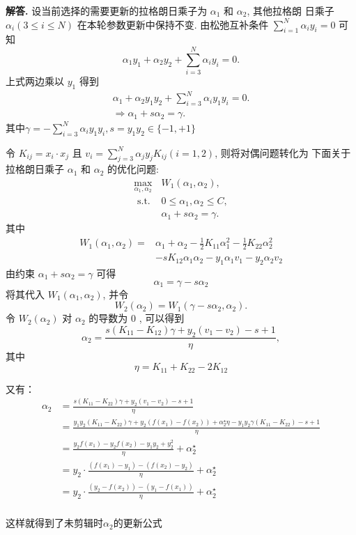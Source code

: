 \documentclass[12pt, a4paper, oneside]{ctexart}
\newenvironment{solution}{\par\noindent\textbf{解答. }}{\\\par}
\begin{document}
\begin{solution}
    设当前选择的需要更新的拉格朗日乘子为 $\alpha_1$ 和 $\alpha_2$, 其他拉格朗 日乘子 $\alpha_i(3 \leq i \leq N)$ 在本轮参数更新中保持不变. 由松弛互补条件 $\sum_{i=1}^N \alpha_i y_i=0$ 可知
$$
\alpha_1 y_1+\alpha_2 y_2+\sum_{i=3}^N \alpha_i y_i=0 .
$$
上式两边乘以 $y_1$ 得到
$$
\begin{array}{l}
\alpha_1+\alpha_2 y_1 y_2+\sum_{i=3}^N \alpha_i y_1 y_i=0 . \\
\Longrightarrow\alpha_1+s \alpha_2=\gamma .
\end{array}
$$
$\text {其中} \gamma=-\sum_{i=3}^N \alpha_i y_1 y_i, s=y_1 y_2 \in\{-1,+1\} $\par
令 $K_{i j}=x_i \cdot x_j$ 且 $v_i=\sum_{j=3}^N \alpha_j y_j K_{i j}(i=1,2)$, 则将对偶问题转化为 下面关于拉格朗日乘子 $\alpha_1$ 和 $\alpha_2$ 的优化问题:
$$
\begin{array}{cl}
\max _{\alpha_1, \alpha_2} & W_1\left(\alpha_1, \alpha_2\right), \\
\text { s.t. } & 0 \leq \alpha_1, \alpha_2 \leq C, \\
& \alpha_1+s \alpha_2=\gamma .
\end{array}
$$
其中
$$
\begin{aligned}
W_1\left(\alpha_1, \alpha_2\right)= & \alpha_1+\alpha_2-\frac{1}{2} K_{11} \alpha_1^2-\frac{1}{2} K_{22} \alpha_2^2 \\
& -s K_{12} \alpha_1 \alpha_2-y_1 \alpha_1 v_1-y_2 \alpha_2 v_2
\end{aligned}
$$
由约束 $\alpha_1+s \alpha_2=\gamma$ 可得
$$
\alpha_1=\gamma-s \alpha_2
$$
将其代入 $W_1\left(\alpha_1, \alpha_2\right)$, 并令
$$
W_2\left(\alpha_2\right)=W_1\left(\gamma-s \alpha_2, \alpha_2\right) .
$$
令 $W_2\left(\alpha_2\right)$ 对 $\alpha_2$ 的导数为 0 , 可以得到
$$
\alpha_2=\frac{s\left(K_{11}-K_{12}\right) \gamma+y_2\left(v_1-v_2\right)-s+1}{\eta},
$$
其中
$$
\eta=K_{11}+K_{22}-2 K_{12}
$$
\par\noindent 又有：
    \begin{align*}
        \alpha_2&=\frac{s(K_{11}-K_{22})\gamma+y_2(v_1-v_2)-s+1}{\eta}\\
                &=\frac{y_1 y_2 (K_{11}-K_{22})\gamma+y_2(f(x_1)-f(x_2))+\alpha_2^\star \eta -y_1 y_2 \gamma (K_{11}-K_{22})-s+1}{\eta}\\
                &=\frac{y_2 f(x_1)-y_2 f(x_2)-y_1 y_2+y_2^2}{\eta}+\alpha_2^\star\\
                &=y_2\cdot \frac{(f(x_1)-y_1)-(f(x_2)-y_2)}{\eta}+\alpha_2^\star\\
                &=y_2\cdot \frac{(y_2-f(x_2))-(y_1-f(x_1))}{\eta}+\alpha_2^\star\\
    \end{align*}
\par
这样就得到了未剪辑时$\alpha_2$的更新公式
\end{solution}
\end{document}

